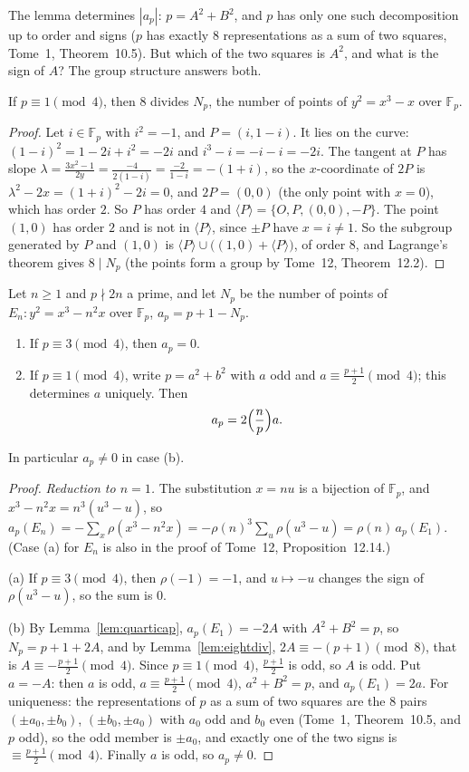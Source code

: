 The lemma determines $|a_p|$: $p=A^2+B^2$, and $p$ has only one such decomposition up to order and signs ($p$ has exactly $8$ representations as a sum of two
squares, Tome~1, Theorem~10.5). But which of the two squares is $A^2$, and what is the sign of $A$? The group structure answers both.

\begin{lemma}\label{lem:eightdiv}
If $p\equiv1\pmod4$, then $8$ divides $N_p$, the number of points of $y^2=x^3-x$ over $\mathbb F_p$.
\end{lemma}
\begin{proof}
Let $i\in\mathbb F_p$ with $i^2=-1$, and $P=(i,1-i)$. It lies on the curve: $(1-i)^2=1-2i+i^2=-2i$ and $i^3-i=-i-i=-2i$. The tangent at $P$ has slope
$\lambda=\frac{3x^2-1}{2y}=\frac{-4}{2(1-i)}=\frac{-2}{1-i}=-(1+i)$, so the $x$-coordinate of $2P$ is $\lambda^2-2x=(1+i)^2-2i=0$, and $2P=(0,0)$
(the only point with $x=0$), which has order $2$. So $P$ has order $4$ and $\langle P\rangle=\{O,P,(0,0),-P\}$. The point $(1,0)$ has order $2$ and is not
in $\langle P\rangle$, since $\pm P$ have $x=i\ne1$. So the subgroup generated by $P$ and $(1,0)$ is $\langle P\rangle\cup\bigl((1,0)+\langle P\rangle\bigr)$,
of order $8$, and Lagrange's theorem gives $8\mid N_p$ (the points form a group by Tome~12, Theorem~12.2).
\end{proof}

\begin{theorem}\label{thm:countEn}
Let $n\ge1$ and $p\nmid2n$ a prime, and let $N_p$ be the number of points of $E_n:y^2=x^3-n^2x$ over $\mathbb F_p$, $a_p=p+1-N_p$.
\begin{enumerate}[label=(\alph*)]
\item If $p\equiv3\pmod4$, then $a_p=0$.
\item If $p\equiv1\pmod4$, write $p=a^2+b^2$ with $a$ odd and $a\equiv\frac{p+1}2\pmod4$; this determines $a$ uniquely. Then
\[
a_p=2\Bigl(\frac np\Bigr)a .
\]
\end{enumerate}
In particular $a_p\ne0$ in case (b).
\end{theorem}
\begin{proof}
\emph{Reduction to $n=1$.} The substitution $x=nu$ is a bijection of $\mathbb F_p$, and $x^3-n^2x=n^3(u^3-u)$, so
$a_p(E_n)=-\sum_x\rho(x^3-n^2x)=-\rho(n)^3\sum_u\rho(u^3-u)=\rho(n)\,a_p(E_1)$. (Case (a) for $E_n$ is also in the proof of Tome~12, Proposition~12.14.)

(a) If $p\equiv3\pmod4$, then $\rho(-1)=-1$, and $u\mapsto-u$ changes the sign of $\rho(u^3-u)$, so the sum is $0$.

(b) By Lemma~\ref{lem:quarticap}, $a_p(E_1)=-2A$ with $A^2+B^2=p$, so $N_p=p+1+2A$, and by Lemma~\ref{lem:eightdiv}, $2A\equiv-(p+1)\pmod8$, that is
$A\equiv-\frac{p+1}2\pmod4$. Since $p\equiv1\pmod4$, $\frac{p+1}2$ is odd, so $A$ is odd. Put $a=-A$: then $a$ is odd, $a\equiv\frac{p+1}2\pmod4$, $a^2+B^2=p$,
and $a_p(E_1)=2a$. For uniqueness: the representations of $p$ as a sum of two squares are the $8$ pairs $(\pm a_0,\pm b_0)$, $(\pm b_0,\pm a_0)$ with $a_0$ odd
and $b_0$ even (Tome~1, Theorem~10.5, and $p$ odd), so the odd member is $\pm a_0$, and exactly one of the two signs is $\equiv\frac{p+1}2\pmod4$. Finally
$a$ is odd, so $a_p\ne0$.
\end{proof}


